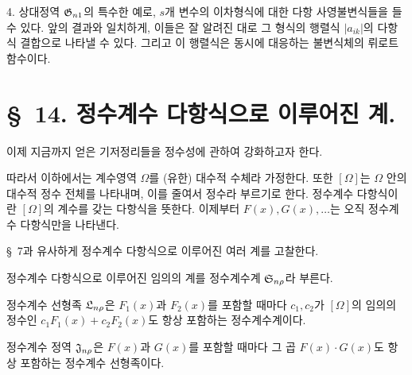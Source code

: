 4. 상대정역 $\mathfrak G_{n1}$의 특수한 예로, $s$개 변수의 이차형식에 대한 다항 사영불변식들을 들 수 있다. 앞의 결과와 일치하게, 이들은 잘 알려진 대로 그 형식의 행렬식 $|a_{ik}|$의 다항식 결합으로 나타낼 수 있다. 그리고 이 행렬식은 동시에 대응하는 불변식체의 뤼로트함수이다.

\section*{\S\ 14. 정수계수 다항식으로 이루어진 계.}

이제 지금까지 얻은 기저정리들을 정수성에 관하여 강화하고자 한다.

따라서 이하에서는 계수영역 $\Omega$를 (유한) 대수적 수체라 가정한다. 또한 $[\Omega]$는 $\Omega$ 안의 대수적 정수 전체를 나타내며, 이를 줄여서 정수라 부르기로 한다. 정수계수 다항식이란 $[\Omega]$의 계수를 갖는 다항식을 뜻한다. 이제부터 $F(x),G(x),\ldots$는 오직 정수계수 다항식만을 나타낸다.

\S\ 7과 유사하게 정수계수 다항식으로 이루어진 여러 계를 고찰한다.

정수계수 다항식으로 이루어진 임의의 계를 정수계수계 $\mathfrak S_{n\rho}$라 부른다.

정수계수 선형족 $\mathfrak L_{n\rho}$은 $F_1(x)$과 $F_2(x)$를 포함할 때마다 $c_1,c_2$가 $[\Omega]$의 임의의 정수인 $c_1F_1(x)+c_2F_2(x)$도 항상 포함하는 정수계수계이다.

정수계수 정역 $\mathfrak J_{n\rho}$은 $F(x)$과 $G(x)$를 포함할 때마다 그 곱 $F(x)\cdot G(x)$도 항상 포함하는 정수계수 선형족이다.

